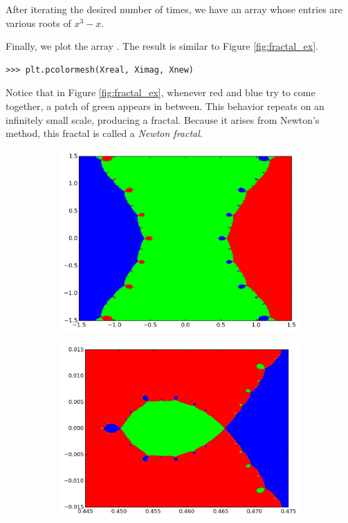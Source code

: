 After iterating the desired number of times, we have an array  whose entries are various roots of $x^3-x$.

Finally, we plot the array . The result is similar to Figure \ref{fig:fractal_ex}.

\begin{lstlisting}
>>> plt.pcolormesh(Xreal, Ximag, Xnew)
\end{lstlisting}

Notice that in Figure \ref{fig:fractal_ex}, whenever red and blue try to come together, a patch of green appears in between.
This behavior repeats on an infinitely small scale, producing a fractal.
Because it arises from Newton's method, this fractal is called a \emph{Newton fractal}.

\begin{figure}
\begin{center}
\begin{subfigure}[b]{.49\textwidth}
\centering
\includegraphics[width=\textwidth]{figures/fractal_ex.png}
\end{subfigure}
\begin{subfigure}[b]{.49\textwidth}
\centering
\includegraphics[width=\textwidth]{figures/fractal_zoom.png}

\end{subfigure}
\end{center}
\end{figure}
